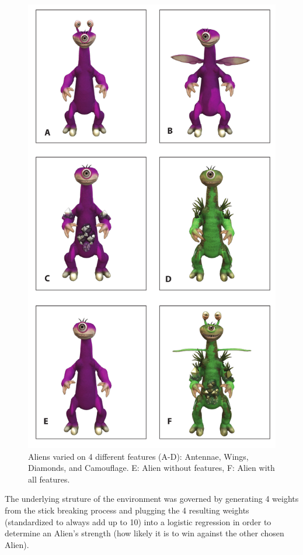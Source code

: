 \documentclass[10pt,letterpaper]{article}
\begin{document}
\begin{figure}[htb!]
		\centering
	\caption{Aliens varied on 4 different features (A-D): Antennae, Wings, Diamonds, and Camouflage. E: Alien without features, F: Alien with all features.}
	\label{Alien_features}
		\includegraphics[scale=0.3]{aliens.png}
\end{figure}
\noindent
The underlying struture of the environment was governed by generating 4 weights from the stick breaking process and plugging the 4 resulting weights (standardized to always add up to 10) into a logistic regression in order to determine an Alien's strength (how likely it is to win against the other chosen Alien).
\end{document}

